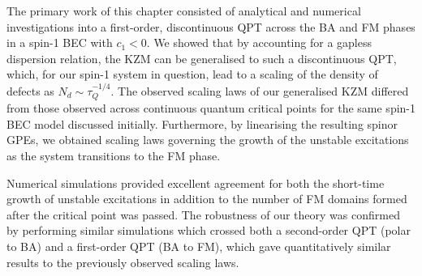The primary work of this chapter consisted of analytical and numerical
investigations into a first-order, discontinuous QPT across the BA and FM
phases in a spin-1 BEC with \(c_1 < 0\).
We showed that by accounting for a gapless dispersion relation, the KZM can be
generalised to such a discontinuous QPT, which, for our spin-1 system in
question, lead to a scaling of the density of defects as
\(N_d \sim \tau_Q^{-1/4}\).
The observed scaling laws of our generalised KZM differed from those observed
across continuous quantum critical points for the same spin-1 BEC model
discussed initially.
Furthermore, by linearising the resulting spinor GPEs, we obtained scaling laws
governing the growth of the unstable excitations as the system transitions to
the FM phase.

Numerical simulations provided excellent agreement for both the short-time
growth of unstable excitations in addition to the number of FM domains formed
after the critical point was passed.
The robustness of our theory was confirmed by performing similar simulations
which crossed both a second-order QPT (polar to BA) and a first-order QPT
(BA to FM), which gave quantitatively similar results to the previously observed
scaling laws.